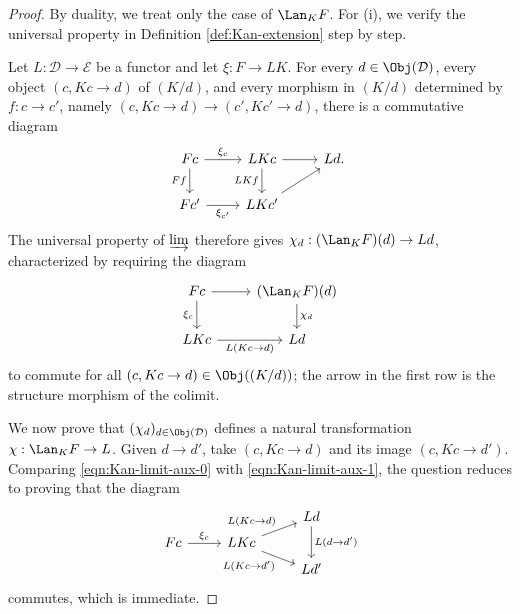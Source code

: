 \begin{proof}
	By duality, we treat only the case of $\Lan_K F$. For (i), we verify the
	universal property in Definition \ref{def:Kan-extension} step by step.

	Let $L: \mathcal{D} \to \mathcal{E}$ be a functor and let
	$\xi: F \to LK$. For every $d \in \Obj(\mathcal{D})$, every object
	$(c,Kc \to d)$ of $(K/d)$, and every morphism in $(K/d)$ determined by
	$f:c\to c'$, namely $(c,Kc\to d)\to(c',Kc'\to d)$, there is a commutative
	diagram
	\[\begin{tikzcd}
		Fc \arrow[r, "\xi_c"] \arrow[d, "Ff"'] & LKc \arrow[d, "LKf"'] \arrow[r] & Ld . \\
		Fc' \arrow[r, "{\xi_{c'}}"'] & LKc' \arrow[ru] &
	\end{tikzcd}\]
	The universal property of $\varinjlim$ therefore gives
	$\chi_d:(\Lan_K F)(d)\to Ld$, characterized by requiring the diagram
	\begin{equation}\label{eqn:Kan-limit-aux-1}
	\begin{tikzcd}
		Fc \arrow[r] \arrow[d, "\xi_c"'] & (\Lan_K F)(d) \arrow[d, "\chi_d"] \\
		LKc \arrow[r, "{L(Kc \to d)}"'] & Ld
	\end{tikzcd}\end{equation}
	to commute for all $(c,Kc\to d)\in\Obj((K/d))$; the arrow in the first row
	is the structure morphism of the colimit.

	We now prove that $(\chi_d)_{d\in\Obj(\mathcal{D})}$ defines a natural
	transformation $\chi:\Lan_K F\to L$. Given $d\to d'$, take
	$(c,Kc\to d)$ and its image $(c,Kc\to d')$. Comparing
	\eqref{eqn:Kan-limit-aux-0} with \eqref{eqn:Kan-limit-aux-1}, the question
	reduces to proving that the diagram
	\[\begin{tikzcd}[row sep=tiny]
		& & Ld \arrow[dd, "{L(d \to d')}"] \\
		Fc \arrow[r, "\xi_c"] & LKc \arrow[ru, "{L(Kc \to d)}"] \arrow[rd, "{L(Kc \to d')}"'] & \\
		& & Ld'
	\end{tikzcd}\]
	commutes, which is immediate.


\end{proof}
